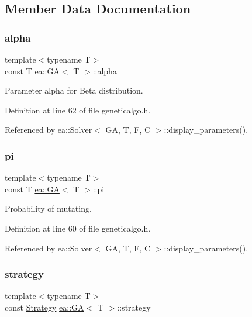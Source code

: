 \subsection{Member Data Documentation}
\mbox{\label{structea_1_1_g_a_a620f9573d21cc8eb9f49bfd8dc5086cc}} 
\subsubsection{\texorpdfstring{alpha}{alpha}}
{\footnotesize\ttfamily template$<$typename T$>$ \\
const T \hyperlink{structea_1_1_g_a}{ea\+::\+GA}$<$ T $>$\+::alpha}



Parameter alpha for Beta distribution. 



Definition at line 62 of file geneticalgo.\+h.



Referenced by ea\+::\+Solver$<$ G\+A, T, F, C $>$\+::display\+\_\+parameters().

\mbox{\label{structea_1_1_g_a_a1efaa83a84ddebf8825308cdf2b7b2ce}} 
\subsubsection{\texorpdfstring{pi}{pi}}
{\footnotesize\ttfamily template$<$typename T$>$ \\
const T \hyperlink{structea_1_1_g_a}{ea\+::\+GA}$<$ T $>$\+::pi}



Probability of mutating. 



Definition at line 60 of file geneticalgo.\+h.



Referenced by ea\+::\+Solver$<$ G\+A, T, F, C $>$\+::display\+\_\+parameters().

\mbox{\label{structea_1_1_g_a_a0bb275a7550304c1ae4c19db06ed8969}} 
\subsubsection{\texorpdfstring{strategy}{strategy}}
{\footnotesize\ttfamily template$<$typename T$>$ \\
const \hyperlink{namespaceea_a8e369877773b4db67b8512efdb4f8f89}{Strategy} \hyperlink{structea_1_1_g_a}{ea\+::\+GA}$<$ T $>$\+::strategy}



